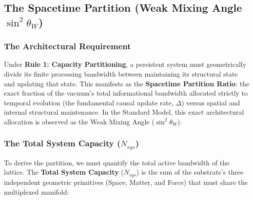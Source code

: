 \subsection{The Spacetime Partition (Weak Mixing Angle \texorpdfstring{$\sin^2 \theta_W$}{sin2thetaW})}
\label{subsec:spacetime_partition}



\subsubsection{The Architectural Requirement}

Under \textbf{Rule 1: Capacity Partitioning}, a persistent system must geometrically divide its finite processing bandwidth between maintaining its structural state and updating that state. This manifests as the \textbf{Spacetime Partition Ratio}: the exact fraction of the vacuum's total informational bandwidth allocated strictly to temporal evolution (the fundamental causal update rate, $\Delta$) versus spatial and internal structural maintenance. In the Standard Model, this exact architectural allocation is observed as the Weak Mixing Angle ($\sin^2 \theta_W$). 

\subsubsection{The Total System Capacity (\texorpdfstring{$N_{sys}$}{Nsys})}
To derive the partition, we must quantify the total active bandwidth of the lattice. The \textbf{Total System Capacity} ($N_{sys}$) is the sum of the substrate's three independent geometric primitives (Space, Matter, and Force) that must share the multiplexed manifold:

